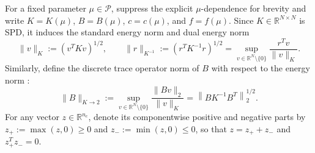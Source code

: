 \documentclass[11pt,a4paper]{article}
\begin{document}
For a fixed parameter \(\mu \in \mathcal{P}\), suppress the explicit \(\mu\)-dependence for brevity and write \(K = K(\mu)\), \(B = B(\mu)\), \(c = c(\mu)\), and \(f = f(\mu)\). Since \(K \in \mathbb{R}^{N \times N}\) is SPD, it induces the standard energy norm and dual energy norm \cite{hild2007residual, zhang2014duality}
\begin{equation}\label{eq:norms}
\|v\|_K := \left( v^T K v \right)^{1/2}, \qquad \|r\|_{K^{-1}} := \left( r^T K^{-1} r \right)^{1/2} = \sup_{v \in \mathbb{R}^N \setminus \{0\}} \frac{r^T v}{\|v\|_K}.
\end{equation}
Similarly, define the discrete trace operator norm of \(B\) with respect to the energy norm \cite{coorevits2000posteriori, hild2007residual}:
\begin{equation}\label{eq:tracenorm}
\|B\|_{K \to 2} := \sup_{v \in \mathbb{R}^N \setminus \{0\}} \frac{\|B v\|_2}{\|v\|_K} = \left\| B K^{-1} B^T \right\|_2^{1/2}.
\end{equation}
For any vector \(z \in \mathbb{R}^{n_c}\), denote its componentwise positive and negative parts by \(z_+ := \max(z, 0) \ge 0\) and \(z_- := \min(z, 0) \le 0\), so that \(z = z_+ + z_-\) and \(z_+^T z_- = 0\).
\end{document}
